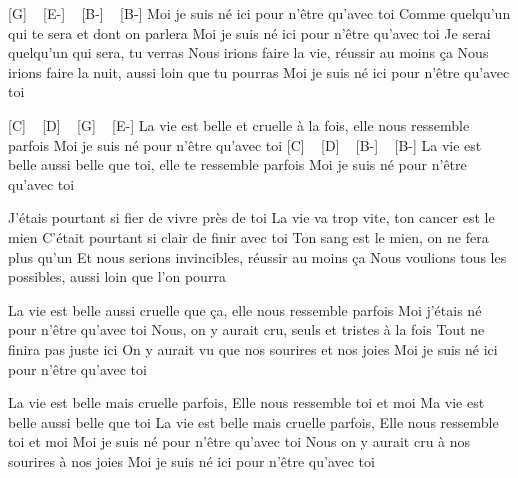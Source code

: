 [G] ~ [E-] ~ [B-] ~ [B-]
Moi je suis né ici pour n'être qu'avec toi
Comme quelqu'un qui te sera et dont on parlera
Moi je suis né ici pour n'être qu'avec toi
Je serai quelqu'un qui sera, tu verras
Nous irions faire la vie, réussir au moins ça
Nous irions faire la nuit, aussi loin que tu pourras
Moi je suis né ici pour n'être qu'avec toi

[C] ~ [D] ~ [G] ~ [E-]
La vie est belle et cruelle à la fois, elle nous ressemble parfois
Moi je suis né pour n'être qu'avec toi
[C] ~ [D] ~ [B-] ~ [B-]
La vie est belle aussi belle que toi, elle te ressemble parfois
Moi je suis né pour n'être qu'avec toi

J'étais pourtant si fier de vivre près de toi
La vie va trop vite, ton cancer est le mien
C'était pourtant si clair de finir avec toi
Ton sang est le mien, on ne fera plus qu'un
Et nous serions invincibles, réussir au moins ça
Nous voulions tous les possibles, aussi loin que l'on pourra


La vie est belle aussi cruelle que ça, elle nous ressemble parfois
Moi j'étais né pour n'être qu'avec toi
Nous, on y aurait cru, seuls et tristes à la fois
Tout ne finira pas juste ici
On y aurait vu que nos sourires et nos joies
Moi je suis né ici pour n'être qu'avec toi

La vie est belle mais cruelle parfois,
Elle nous ressemble toi et moi
Ma vie est belle aussi belle que toi
La vie est belle mais cruelle parfois,
Elle nous ressemble toi et moi
Moi je suis né pour n'être qu'avec toi
Nous on y aurait cru à nos sourires à nos joies
Moi je suis né ici pour n'être qu'avec toi 